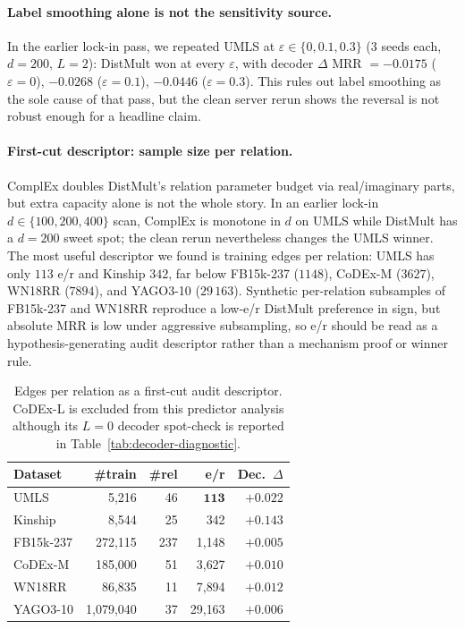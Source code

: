 \documentclass[runningheads]{llncs}
\begin{document}
\paragraph{Label smoothing alone is not the sensitivity source.}
In the earlier lock-in pass, we repeated UMLS at $\varepsilon \in \{0, 0.1, 0.3\}$ (3 seeds each, $d{=}200$, $L{=}2$): DistMult won at every $\varepsilon$, with decoder $\Delta$ MRR $= -0.0175$ ($\varepsilon{=}0$), $-0.0268$ ($\varepsilon{=}0.1$), $-0.0446$ ($\varepsilon{=}0.3$). This rules out label smoothing as the sole cause of that pass, but the clean server rerun shows the reversal is not robust enough for a headline claim.

\paragraph{First-cut descriptor: sample size per relation.}
ComplEx doubles DistMult's relation parameter budget via real/imaginary parts, but extra capacity alone is not the whole story. In an earlier lock-in $d \in \{100,200,400\}$ scan, ComplEx is monotone in $d$ on UMLS while DistMult has a $d{=}200$ sweet spot; the clean rerun nevertheless changes the UMLS winner. The most useful descriptor we found is training edges per relation: UMLS has only $113$ e/r and Kinship $342$, far below FB15k-237 ($1148$), CoDEx-M ($3627$), WN18RR ($7894$), and YAGO3-10 ($29\,163$). Synthetic per-relation subsamples of FB15k-237 and WN18RR reproduce a low-e/r DistMult preference in sign, but absolute MRR is low under aggressive subsampling, so e/r should be read as a hypothesis-generating audit descriptor rather than a mechanism proof or winner rule.

\begin{table}[!htbp]
\centering
\caption{Edges per relation as a first-cut audit descriptor. CoDEx-L is excluded from this predictor analysis although its $L{=}0$ decoder spot-check is reported in Table~\ref{tab:decoder-diagnostic}.}
\label{tab:edges-per-rel}
\footnotesize
\setlength{\tabcolsep}{3pt}
\begin{tabular}{lrrrr}
\toprule
Dataset & \#train & \#rel & e/r & Dec.\ $\Delta$ \\
\midrule
UMLS      & 5{,}216 & 46 & $\mathbf{113}$ & $+0.022$ \\
Kinship   & 8{,}544 & 25 & 342 & $\mathbf{+0.143}$ \\
FB15k-237 & 272{,}115 & 237 & 1{,}148 & $+0.005$ \\
CoDEx-M   & 185{,}000 & 51 & 3{,}627 & $+0.010$ \\
WN18RR    & 86{,}835 & 11 & 7{,}894 & $+0.012$ \\
YAGO3-10  & 1{,}079{,}040 & 37 & 29{,}163 & $+0.006$ \\
\bottomrule
\end{tabular}
\end{table}
\end{document}
